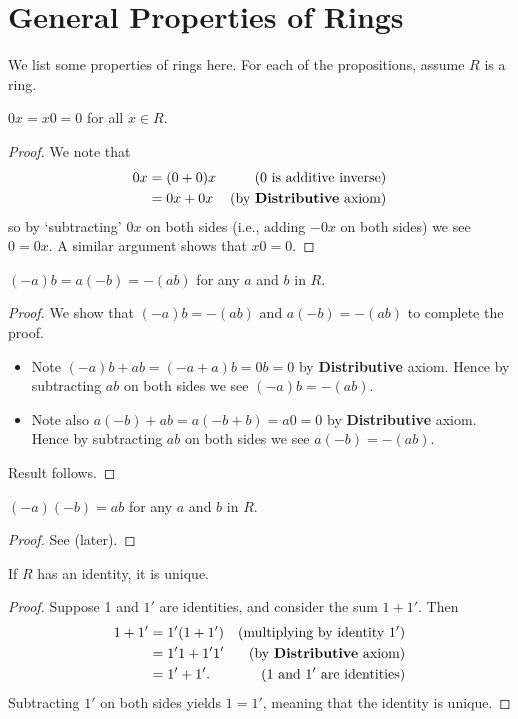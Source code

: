 \section{General Properties of Rings}
We list some properties of rings here. For each of the propositions, assume $R$ is a ring.

\begin{proposition}\label{prop-multiplying-by-zero-is-zero}
    $0x = x0 = 0$ for all $x \in R$.
\end{proposition}
\begin{proof}
    We note that
    \begin{align*}
        0x &= (0 + 0)x & (0 \text{ is additive inverse})\\
        &= 0x + 0x & (\text{by \textbf{Distributive} axiom})
    \end{align*}
    so by `subtracting' $0x$ on both sides (i.e., adding $-0x$ on both sides) we see $0 = 0x$. A similar argument shows that $x0 = 0$.
\end{proof}

\begin{proposition}\label{prop-product-of-element-and-additive-inverse-is-additive-inverse-of-product}
    $(-a)b = a(-b) = -(ab)$ for any $a$ and $b$ in $R$.
\end{proposition}
\begin{proof}
    We show that $(-a)b = -(ab)$ and $a(-b) = -(ab)$ to complete the proof.
    \begin{itemize}
        \item Note $(-a)b + ab = (-a + a)b = 0b = 0$ by \textbf{Distributive} axiom. Hence by subtracting $ab$ on both sides we see $(-a)b = -(ab)$.
        \item Note also $a(-b) + ab = a(-b + b) = a0 = 0$ by \textbf{Distributive} axiom. Hence by subtracting $ab$ on both sides we see $a(-b) = -(ab)$.
    \end{itemize}
    Result follows.
\end{proof}

\begin{proposition}
    $(-a)(-b) = ab$ for any $a$ and $b$ in $R$.
\end{proposition}
\begin{proof}
    See  (later).
\end{proof}

\begin{proposition}
    If $R$ has an identity, it is unique.
\end{proposition}
\begin{proof}
    Suppose 1 and $1'$ are identities, and consider the sum $1 + 1'$. Then
    \begin{align*}
        1 + 1' &= 1'(1+1') & (\text{multiplying by identity }1')\\
        &= 1'1 + 1'1' & (\text{by \textbf{Distributive} axiom})\\
        &= 1' + 1'. & (1 \text{ and } 1' \text{ are identities})
    \end{align*}
    Subtracting $1'$ on both sides yields $1 = 1'$, meaning that the identity is unique.
\end{proof}

